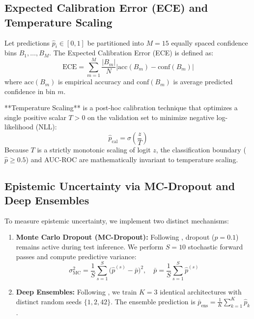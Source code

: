 \documentclass[12pt,a4paper]{article}
\begin{document}
\subsection{Expected Calibration Error (ECE) and Temperature Scaling}
Let predictions $\hat{p}_i \in [0, 1]$ be partitioned into $M = 15$ equally spaced confidence bins $B_1, \dots, B_M$. The Expected Calibration Error (ECE) is defined as:
\begin{equation}
    \text{ECE} = \sum_{m=1}^{M} \frac{|B_m|}{N} \Big| \text{acc}(B_m) - \text{conf}(B_m) \Big|
\end{equation}
where $\text{acc}(B_m)$ is empirical accuracy and $\text{conf}(B_m)$ is average predicted confidence in bin $m$.

**Temperature Scaling** \citep{guo2017calibration} is a post-hoc calibration technique that optimizes a single positive scalar $T > 0$ on the validation set to minimize negative log-likelihood (NLL):
\begin{equation}
    \hat{p}_{\text{cal}} = \sigma\left(\frac{z}{T}\right)
\end{equation}
Because $T$ is a strictly monotonic scaling of logit $z$, the classification boundary ($\hat{p} \ge 0.5$) and AUC-ROC are mathematically invariant to temperature scaling.

\subsection{Epistemic Uncertainty via MC-Dropout and Deep Ensembles}
To measure epistemic uncertainty, we implement two distinct mechanisms:
\begin{enumerate}
    \item \textbf{Monte Carlo Dropout (MC-Dropout):} Following \citet{gal2016dropout}, dropout ($p = 0.1$) remains active during test inference. We perform $S = 10$ stochastic forward passes and compute predictive variance:
    \begin{equation}
        \sigma^2_{\text{MC}} = \frac{1}{S} \sum_{s=1}^{S} \big(\hat{p}^{(s)} - \bar{p}\big)^2, \quad \bar{p} = \frac{1}{S}\sum_{s=1}^S \hat{p}^{(s)}
    \end{equation}
    \item \textbf{Deep Ensembles:} Following \citet{lakshminarayanan2017simple}, we train $K = 3$ identical architectures with distinct random seeds $\{1, 2, 42\}$. The ensemble prediction is $\bar{p}_{\text{ens}} = \frac{1}{K}\sum_{k=1}^K \hat{p}_k$.
\end{enumerate}
\end{document}
